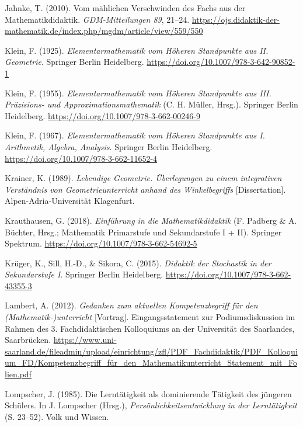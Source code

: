 \documentclass[
]{scrbook}
\newlength{\cslhangindent}
\newenvironment{CSLReferences}[2] %
 {\begin{list}{}{%
  \setlength{\itemindent}{0pt}
  \setlength{\leftmargin}{0pt}
  \setlength{\parsep}{0pt}
  \ifodd #1
   \setlength{\leftmargin}{\cslhangindent}
   \setlength{\itemindent}{-1\cslhangindent}
  \fi
  \setlength{\itemsep}{#2\baselineskip}}}
 {\end{list}}
\theoremstyle{definition}
\theoremstyle{definition}
\theoremstyle{definition}
\theoremstyle{definition}
\theoremstyle{remark}
\begin{document}
\begin{CSLReferences}{1}{0}
Jahnke, T. (2010). Vom mählichen {Verschwinden} des {Fachs} aus der {Mathematikdidaktik}. \emph{GDM-Mitteilungen 89}, 21--24. \url{https://ojs.didaktik-der-mathematik.de/index.php/mgdm/article/view/559/550}

Klein, F. (1925). \emph{Elementarmathematik vom {Höheren} {Standpunkte} aus {II}. {Geometrie}}. Springer Berlin Heidelberg. \url{https://doi.org/10.1007/978-3-642-90852-1}

Klein, F. (1955). \emph{Elementarmathematik vom {Höheren} {Standpunkte} aus {III}. {Präzisions}- und {Approximationsmathematik}} (C. H. Müller, Hrsg.). Springer Berlin Heidelberg. \url{https://doi.org/10.1007/978-3-662-00246-9}

Klein, F. (1967). \emph{Elementarmathematik vom {Höheren} {Standpunkte} aus {I}. {Arithmetik}, {Algebra}, {Analysis}}. Springer Berlin Heidelberg. \url{https://doi.org/10.1007/978-3-662-11652-4}

Krainer, K. (1989). \emph{Lebendige {Geometrie}. Überlegungen zu einem integrativen {Verständnis} von {Geometrieunterricht} anhand des {Winkelbegriffs}} {[}Dissertation{]}. Alpen-Adria-Universität Klagenfurt.

Krauthausen, G. (2018). \emph{Einführung in die {Mathematikdidaktik}} (F. Padberg \& A. Büchter, Hrsg.; Mathematik Primarstufe und Sekundarstufe I + II). Springer Spektrum. \url{https://doi.org/10.1007/978-3-662-54692-5}

Krüger, K., Sill, H.-D., \& Sikora, C. (2015). \emph{Didaktik der {Stochastik} in der {Sekundarstufe} {I}}. Springer Berlin Heidelberg. \url{https://doi.org/10.1007/978-3-662-43355-3}

Lambert, A. (2012). \emph{Gedanken zum aktuellen {Kompetenzbegriff} für den ({Mathematik}-)unterricht} {[}Vortrag{]}. Eingangsstatement zur Podiumsdiskussion im Rahmen des 3. Fachdidaktischen Kolloquiums an der Universität des Saarlandes, Saarbrücken. \url{https://www.uni-saarland.de/fileadmin/upload/einrichtung/zfl/PDF_Fachdidaktik/PDF_Kolloquium_FD/Kompetenzbegriff_für_den_Mathematikunterricht_Statement_mit_Folien.pdf}

Lompscher, J. (1985). Die {Lerntätigkeit} als dominierende {Tätigkeit} des jüngeren {Schülers}. In J. Lompscher (Hrsg.), \emph{Persönlichkeitsentwicklung in der {Lerntätigkeit}} (S. 23--52). Volk und Wissen.


\end{CSLReferences}
\end{document}
